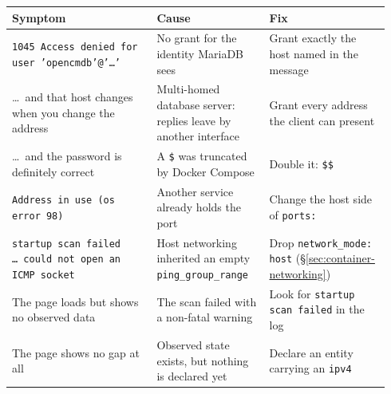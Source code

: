 \documentclass[11pt,oneside,listof=totoc,bibliography=totoc]{scrreprt}
\begin{document}
\begin{center}
\small
\begin{tabular}{@{}p{0.36\linewidth}p{0.28\linewidth}p{0.30\linewidth}@{}}
\toprule
\textbf{Symptom} & \textbf{Cause} & \textbf{Fix} \\
\midrule
\texttt{1045 Access denied for user 'opencmdb'@'\ldots'}
  & No grant for the identity MariaDB sees
  & Grant exactly the host named in the message \\
\addlinespace
\ldots\ and that host changes when you change the address
  & Multi-homed database server: replies leave by another interface
  & Grant every address the client can present \\
\addlinespace
\ldots\ and the password is definitely correct
  & A \texttt{\$} was truncated by Docker Compose
  & Double it: \texttt{\$\$} \\
\addlinespace
\texttt{Address in use (os error 98)}
  & Another service already holds the port
  & Change the host side of \texttt{ports:} \\
\addlinespace
\texttt{startup scan failed \ldots\ could not open an ICMP socket}
  & Host networking inherited an empty \texttt{ping\_group\_range}
  & Drop \texttt{network\_mode: host} (\S\ref{sec:container-networking}) \\
\addlinespace
The page loads but shows no observed data
  & The scan failed with a non-fatal warning
  & Look for \texttt{startup scan failed} in the log \\
\addlinespace
The page shows no gap at all
  & Observed state exists, but nothing is declared yet
  & Declare an entity carrying an \texttt{ipv4} \\
\bottomrule
\end{tabular}
\end{center}
\end{document}
